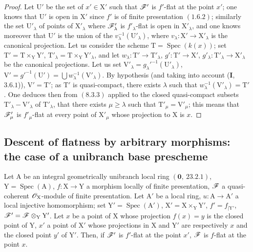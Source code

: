 \begin{proof}
Let $\mathrm{U}'$ be the set of $x'\in\mathrm{X}'$ such that $\mathscr{F}'$ is $f'$-flat at the point $x'$; one knows 
that $\mathrm{U}'$ is open in $\mathrm{X}'$ since $f'$ is of finite presentation $(1.6.2)$; similarly the
set $\mathrm{U}'_\lambda$ of points of $\mathrm{X}'_\lambda$ where $\mathscr{F}'_\lambda$ is $f'_\lambda$-flat is open in $\mathrm{X}'_\lambda$, and one knows moreover
 that $\mathrm{U}'$ is the union of the $v_\lambda^{-1}(\mathrm{U}'_\lambda)$, where $v_\lambda:\mathrm{X}'\to\mathrm{X}'_\lambda$ is the canonical projection.
Let us consider the scheme $\mathrm{T}=\operatorname{Spec}(k(x))$; set $\mathrm{T}'=\mathrm{T}\times_\mathrm{Y}\mathrm{Y}'$, $\mathrm{T}'_\lambda=\mathrm{T}\times_\mathrm{Y}\mathrm{Y}'_\lambda$, and let
$w_\lambda:\mathrm{T}'\to\mathrm{T}'_\lambda$, $g':\mathrm{T}'\to\mathrm{X}'$, $g'_\lambda:\mathrm{T}'_\lambda\to\mathrm{X}'_\lambda$ be the canonical projections. Let us set $\mathrm{V}'_\lambda=g_\lambda'^{-1}(\mathrm{U}'_\lambda)$,
$\mathrm{V}'=g'^{-1}(\mathrm{U}')=\bigcup w_\lambda^{-1}(\mathrm{V}'_\lambda)$. By hypothesis (and taking into account (\textbf{I},~$3.6.1$)), $\mathrm{V}'=\mathrm{T}'$;
as $\mathrm{T}'$ is quasi-compact, there exists $\lambda$ such that $w_\lambda^{-1}(\mathrm{V}'_\lambda)=\mathrm{T}'$. One deduces then from $(8.3.3)$
applied to the closed quasi-compact subsets $\mathrm{T}'_\lambda-\mathrm{V}'_\lambda$ of $\mathrm{T}'_\lambda$, that there exists $\mu\geq\lambda$ such
that $\mathrm{T}'_\mu=\mathrm{V}'_\mu$; this means that $\mathscr{F}'_\mu$ is $f'_\mu$-flat at every point of $\mathrm{X}'_\mu$ whose projection
to $\mathrm{X}$ is $x$.
\end{proof}

\subsection{Descent of flatness by arbitrary morphisms: the case of a unibranch base prescheme}
\label{subsection:IV.11.6}

\begin{theorem}[11.6.1]
\label{IV.11.6.1}
Let $\mathrm{A}$ be an integral geometrically unibranch local ring
$(\mathbf{0},~23.2.1)$, $\mathrm{Y}=\operatorname{Spec}(\mathrm{A})$, $f:\mathrm{X}\to\mathrm{Y}$ a morphism locally of finite presentation, $\mathscr{F}$ a
quasi-coherent $\mathscr{O}_\mathrm{X}$-module of finite presentation. Let $\mathrm{A}'$ be a local ring, $u:\mathrm{A}\to\mathrm{A}'$ a local
injective homomorphism; set $\mathrm{Y}'=\operatorname{Spec}(\mathrm{A}')$, $\mathrm{X}'=\mathrm{X}\times_\mathrm{Y}\mathrm{Y}'$, $f'=f_{|\mathrm{Y}'}$, $\mathscr{F}'=\mathscr{F}\otimes_\mathrm{Y}\mathrm{Y}'$. Let $x$ be
a point of $\mathrm{X}$ whose projection $f(x)=y$ is the closed point of $\mathrm{Y}$, $x'$ a point of $\mathrm{X}'$ whose projections
in $\mathrm{X}$ and $\mathrm{Y}'$ are respectively $x$ and the closed point $y'$ of $\mathrm{Y}'$. Then, if $\mathscr{F}'$ is $f'$-flat at the point $x'$,
$\mathscr{F}$ is $f$-flat at the point $x$.
\end{theorem}

